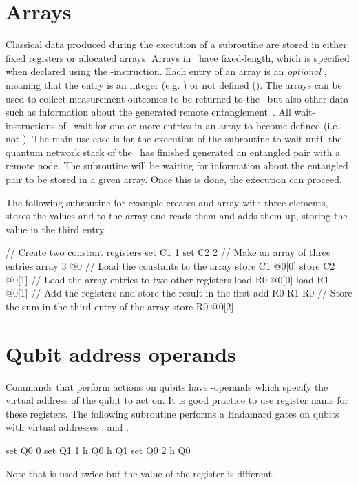 \section{Arrays}
Classical data produced during the execution of a subroutine are stored in either fixed registers or allocated arrays.
Arrays in \netqasm\ have fixed-length, which is specified when declared using the -instruction.
Each entry of an array is an \emph{optional} \IMMEDIATE, meaning that the entry is an integer (e.g. ) or not defined ().
The arrays can be used to collect measurement outcomes to be returned to the \host\ but also other data such as information about the generated remote entanglement~\cite{dahlberg2019linklayer,kozlowski2020networklayer}.
All wait-instructions of \netqasm\ wait for one or more entries in an array to become defined (i.e. not ).
The main use-case is for the execution of the subroutine to wait until the quantum network stack of the \QNPU\ has finished generated an entangled pair with a remote node.
The subroutine will be waiting for information about the entangled pair to be stored in a given array.
Once this is done, the execution can proceed.

The following subroutine for example creates and array with three elements, stores the values  and  to the array and reads them and adds them up, storing the value in the third entry.
\begin{nqcode}
// Create two constant registers
set C1 1
set C2 2
// Make an array of three entries
array 3 @0
// Load the constants to the array
store C1 @0[0]
store C2 @0[1]
// Load the array entries to two other registers
load R0 @0[0]
load R1 @0[1]
// Add the registers and store the result in the first
add R0 R1 R0
// Store the sum in the third entry of the array
store R0 @0[2]\end{nqcode}

\section{Qubit address operands}
Commands that perform actions on qubits have \REGISTER-operands which specify the virtual address of the qubit to act on.
It is good practice to use register name  for these registers.
The following subroutine performs a Hadamard gates on qubits with virtual addresses ,  and .
\begin{nqcode}
set Q0 0
set Q1 1
h Q0
h Q1
set Q0 2
h Q0\end{nqcode}
Note that  is used twice but the value of the register is different.

